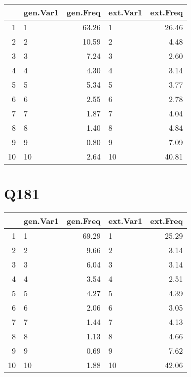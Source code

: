 \documentclass{amsart}
\begin{document}
\begin{table}[ht]
\centering
\begin{tabular}{rlrlr}
  \hline
 & gen.Var1 & gen.Freq & ext.Var1 & ext.Freq \\ 
  \hline
1 & 1 & 63.26 & 1 & 26.46 \\ 
  2 & 2 & 10.59 & 2 & 4.48 \\ 
  3 & 3 & 7.24 & 3 & 2.60 \\ 
  4 & 4 & 4.30 & 4 & 3.14 \\ 
  5 & 5 & 5.34 & 5 & 3.77 \\ 
  6 & 6 & 2.55 & 6 & 2.78 \\ 
  7 & 7 & 1.87 & 7 & 4.04 \\ 
  8 & 8 & 1.40 & 8 & 4.84 \\ 
  9 & 9 & 0.80 & 9 & 7.09 \\ 
  10 & 10 & 2.64 & 10 & 40.81 \\ 
   \hline
\end{tabular}
\end{table}

\section{Q181}
\begin{table}[ht]
\centering
\begin{tabular}{rlrlr}
  \hline
 & gen.Var1 & gen.Freq & ext.Var1 & ext.Freq \\ 
  \hline
1 & 1 & 69.29 & 1 & 25.29 \\ 
  2 & 2 & 9.66 & 2 & 3.14 \\ 
  3 & 3 & 6.04 & 3 & 3.14 \\ 
  4 & 4 & 3.54 & 4 & 2.51 \\ 
  5 & 5 & 4.27 & 5 & 4.39 \\ 
  6 & 6 & 2.06 & 6 & 3.05 \\ 
  7 & 7 & 1.44 & 7 & 4.13 \\ 
  8 & 8 & 1.13 & 8 & 4.66 \\ 
  9 & 9 & 0.69 & 9 & 7.62 \\ 
  10 & 10 & 1.88 & 10 & 42.06 \\ 
   \hline
\end{tabular}
\end{table}
\end{document}
